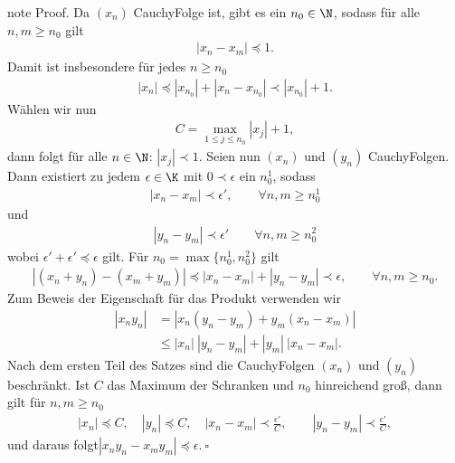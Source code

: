 \documentclass[letterpaper,10pt,english]{jupyterBook}
\begin{document}
\begin{sphinxadmonition}{note}
Proof.  Da \((x_n)\) Cauchy\sphinxhyphen{}Folge ist, gibt es ein \(n_0 \in \N\), sodass für alle \(n,m \geq n_0\) gilt
\begin{equation*}
\begin{split} | x_n - x_m | \preceq 1.\end{split}
\end{equation*}
Damit ist insbesondere für jedes \(n \geq n_0\)
\begin{equation*}
\begin{split}|x_n| \preceq |x_{n_0}| + |x_n - x_{n_0}| \prec |x_{n_0}| +1.\end{split}
\end{equation*}
Wählen wir nun
\begin{equation*}
\begin{split}C = \max_{1 \leq j \leq n_0} |x_j| + 1,\end{split}
\end{equation*}
dann folgt für alle \(n \in \N\): \(|x_j| \prec 1\).
Seien nun \((x_n)\) und \((y_n)\) Cauchy\sphinxhyphen{}Folgen. Dann existiert zu jedem \(\epsilon \in \K\) mit \(0 \prec \epsilon\) ein \(n_0^1\), sodass
\begin{equation*}
\begin{split}|x_n - x_m| \prec \epsilon', \qquad \forall n,m \geq n_0^1\end{split}
\end{equation*}
und
\begin{equation*}
\begin{split}|y_n - y_m| \prec \epsilon' \qquad \forall n,m \geq n_0^2\end{split}
\end{equation*}
wobei \(\epsilon'+\epsilon' \preceq \epsilon\)
gilt. Für \(n_0 = \max\{n_0^1,n_0^2\}\) gilt
\begin{equation*}
\begin{split}|(x_n+y_n) - (x_m+y_m)| \preceq |x_n - x_m| + |y_n - y_m| \prec {\epsilon} , \qquad \forall n,m \geq n_0.\end{split}
\end{equation*}
Zum Beweis der Eigenschaft für das Produkt verwenden wir
\begin{align*}
|x_n y_n| &= | x_n(y_n -y_m) + y_m (x_n - x_m) | \\&\leq |x_n| ~|y_n - y_m| + |y_m|~|x_n - x_m|.\end{align*}
Nach dem ersten Teil des Satzes sind die Cauchy\sphinxhyphen{}Folgen \((x_n)\) und \((y_n)\) beschränkt. Ist \(C\) das Maximum der Schranken und \(n_0\) hinreichend groß, dann gilt für \(n,m \geq n_0\)
\begin{equation*}
\begin{split}|x_n| \preceq C, \quad |y_n| \preceq C, \quad |x_n - x_m| \prec \frac{\epsilon'}{C}, \qquad|y_n - y_m| \prec \frac{\epsilon'}{C},\end{split}
\end{equation*}
und daraus folgt\( |x_n y_n - x_m y_m | \preceq \epsilon.~\square \)
\end{sphinxadmonition}
\end{document}
